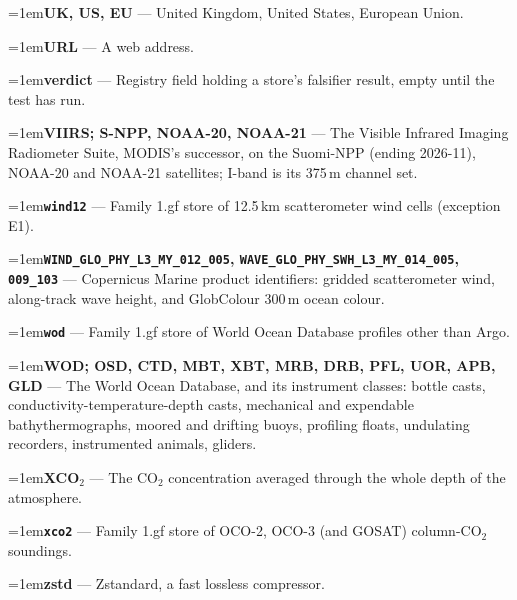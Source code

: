 \documentclass[10pt]{article}
\newcommand{\code}[1]{\texttt{#1}}
\newcommand{\gl}[2]{\par\hangindent=1em\hangafter=1\textbf{#1} --- #2\par}
\begin{document}
\gl{UK, US, EU}{United Kingdom, United States, European Union.}
\gl{URL}{A web address.}
\gl{verdict}{Registry field holding a store's falsifier result, empty until the test has run.}
\gl{VIIRS; S-NPP, NOAA-20, NOAA-21}{The Visible Infrared Imaging Radiometer Suite, MODIS's successor, on the Suomi-NPP (ending 2026-11), NOAA-20 and NOAA-21 satellites; I-band is its 375\,m channel set.}
\gl{\code{wind12}}{Family 1.gf store of 12.5\,km scatterometer wind cells (exception E1).}
\gl{\code{WIND\_GLO\_PHY\_L3\_MY\_012\_005}, \code{WAVE\_GLO\_PHY\_SWH\_L3\_MY\_014\_005}, \code{009\_103}}{Copernicus Marine product identifiers: gridded scatterometer wind, along-track wave height, and GlobColour 300\,m ocean colour.}
\gl{\code{wod}}{Family 1.gf store of World Ocean Database profiles other than Argo.}
\gl{WOD; OSD, CTD, MBT, XBT, MRB, DRB, PFL, UOR, APB, GLD}{The World Ocean Database, and its instrument classes: bottle casts, conductivity-temperature-depth casts, mechanical and expendable bathythermographs, moored and drifting buoys, profiling floats, undulating recorders, instrumented animals, gliders.}
\gl{XCO$_2$}{The CO$_2$ concentration averaged through the whole depth of the atmosphere.}
\gl{\code{xco2}}{Family 1.gf store of OCO-2, OCO-3 (and GOSAT) column-CO$_2$ soundings.}
\gl{zstd}{Zstandard, a fast lossless compressor.}
\normalsize
\end{document}
